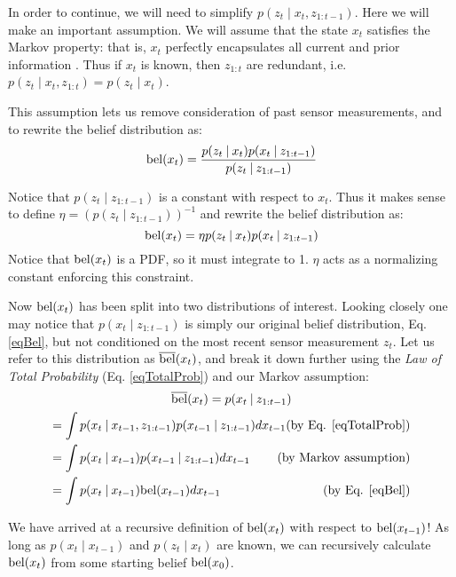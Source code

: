 In order to continue, we will need to simplify \(p(z_t \mathbin{\vert} x_t, z_{1:t-1})\). Here we will make an important assumption. We will assume that the state \(x_t\) satisfies the Markov property: that is, \(x_t\) perfectly encapsulates all current and prior information \cite{robot_localization_paper}. Thus if \(x_t\) is known, then \(z_{1:t}\) are redundant, i.e. \(p(z_t \mathbin{\vert} x_t, z_{1:t}) = p(z_t \mathbin{\vert} x_t)\).

This assumption lets us remove consideration of past sensor measurements, and to rewrite the belief distribution as:
\begin{equation*}
\mathrm{bel}(x_t) = \frac{p(z_t \mathbin{\vert} x_t)p(x_t \mathbin{\vert} z_{1:t-1})}{p(z_t \mathbin{\vert} z_{1:t-1})}
\end{equation*}

Notice that \(p(z_t \mathbin{\vert} z_{1:t-1})\) is a constant with respect to \(x_t\). Thus it makes sense to define \(\eta = (p(z_t \mathbin{\vert} z_{1:t-1}))^{-1}\) and rewrite the belief distribution as:
\begin{equation*}
\mathrm{bel}(x_t) = \eta p(z_t \mathbin{\vert} x_t) p(x_t \mathbin{\vert} z_{1:t-1})
\end{equation*}
Notice that \(\mathrm{bel}(x_t)\) is a PDF, so it must integrate to 1. \(\eta\) acts as a normalizing constant enforcing this constraint.

Now \(\mathrm{bel}(x_t)\) has been split into two distributions of interest. Looking closely one may notice that \(p(x_t \mathbin{\vert} z_{1:t-1})\) is simply our original belief distribution, Eq. \ref{eqBel}, but not conditioned on the most recent sensor measurement \(z_t\). Let us refer to this distribution as \(\overline{\mathrm{bel}}(x_t)\), and break it down further using the \textit{Law of Total Probability} (Eq. \ref{eqTotalProb}) and our Markov assumption:
\begin{multline*}
\overline{\bel}(x_t) = p(x_t \mathbin{\vert} z_{1:t-1}) \\
= \int p(x_t \mathbin{\vert} x_{t-1}, z_{1:t-1}) p(x_{t-1} \mathbin{\vert} z_{1:t-1})dx_{t-1} \hfill \text{(by Eq. \ref{eqTotalProb})}\\
= \int p(x_t \mathbin{\vert} x_{t-1}) p(x_{t-1} \mathbin{\vert} z_{1:t-1})dx_{t-1} \hfill \text{  (by Markov assumption)} \\
= \int p(x_t \mathbin{\vert} x_{t-1}) \bel(x_{t-1})dx_{t-1}  \hfill \text{(by Eq. \ref{eqBel})}
\end{multline*}

We have arrived at a recursive definition of \(\mathrm{bel}(x_t)\) with respect to \(\mathrm{bel}(x_{t-1})\)! As long as \(p(x_t \mathbin{\vert} x_{t-1})\) and \(p(z_t \mathbin{\vert} x_t)\) are known, we can recursively calculate \(\mathrm{bel}(x_t)\) from some starting belief \(\mathrm{bel}(x_0)\).

